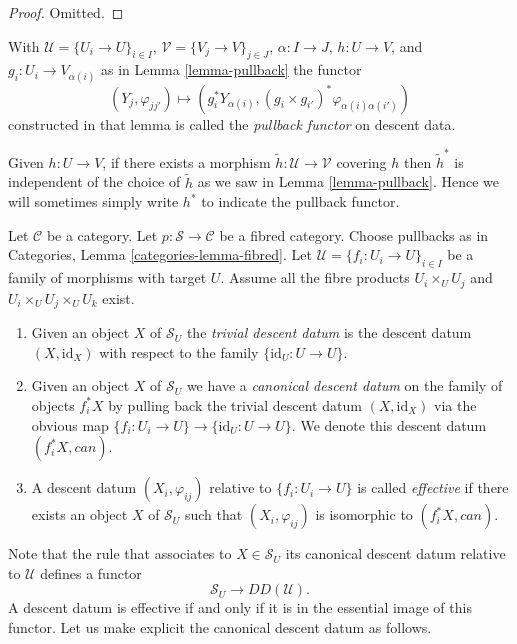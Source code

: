 \begin{proof}
Omitted.
\end{proof}

\begin{definition}
\label{definition-pullback-functor}
With $\mathcal{U} = \{U_i \to U\}_{i \in I}$,
$\mathcal{V} = \{V_j \to V\}_{j \in J}$,
$\alpha : I \to J$, $h : U \to V$,
and $g_i : U_i \to V_{\alpha(i)}$ as in Lemma \ref{lemma-pullback}
the functor
$$
(Y_j, \varphi_{jj'}) \longmapsto
(g_i^*Y_{\alpha(i)}, (g_i \times g_{i'})^*\varphi_{\alpha(i)\alpha(i')})
$$
constructed in that lemma
is called the {\it pullback functor} on descent data.
\end{definition}

\noindent
Given $h : U \to V$, if there exists a morphism
$\tilde h : \mathcal{U} \to \mathcal{V}$ covering $h$
then $\tilde h^*$ is independent of the choice of
$\tilde h$ as we saw in Lemma \ref{lemma-pullback}.
Hence we will sometimes simply write $h^*$ to indicate
the pullback functor.

\begin{definition}
\label{definition-effective-descent-datum}
Let $\mathcal{C}$ be a category.
Let $p : \mathcal{S} \to \mathcal{C}$ be a fibred category.
Choose pullbacks as in Categories, Lemma \ref{categories-lemma-fibred}.
Let $\mathcal{U} = \{f_i : U_i \to U\}_{i \in I}$ be a family of morphisms
with target $U$. Assume all the fibre products
$U_i \times_U U_j$ and $U_i \times_U U_j \times_U U_k$ exist.
\begin{enumerate}
\item Given an object $X$ of $\mathcal{S}_U$ the {\it trivial descent datum}
is the descent datum $(X, \text{id}_X)$ with respect to the family
$\{\text{id}_U : U \to U\}$.
\item Given an object $X$ of $\mathcal{S}_U$
we have a {\it canonical descent datum} on the family of
objects $f_i^*X$ by pulling back the trivial
descent datum $(X, \text{id}_X)$ via the
obvious map $\{f_i : U_i \to U\} \to \{\text{id}_U : U \to U\}$.
We denote this descent datum $(f_i^*X, can)$.
\item A descent datum $(X_i, \varphi_{ij})$
relative to $\{f_i : U_i \to U\}$ is called {\it effective}
if there exists an object $X$ of $\mathcal{S}_U$ such that
$(X_i, \varphi_{ij})$ is isomorphic to $(f_i^*X, can)$.
\end{enumerate}
\end{definition}

\noindent
Note that the rule that associates to $X \in \mathcal{S}_U$ its
canonical descent datum relative to $\mathcal{U}$ defines a
functor
$$
\mathcal{S}_U \longrightarrow DD(\mathcal{U}).
$$
A descent datum is effective if and only if it is in the essential
image of this functor.
Let us make explicit the canonical descent datum as follows.


